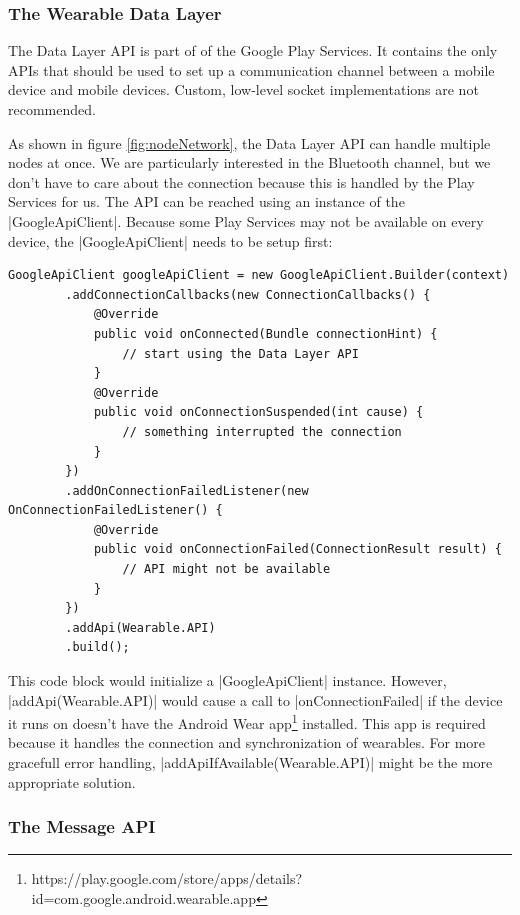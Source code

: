 \clearpage

\subsubsection{The Wearable Data Layer}

The Data Layer API is part of of the Google Play Services.
It contains the only APIs that should be used to set up a communication channel between a mobile device and mobile devices. 
Custom, low-level socket implementations are not recommended.

As shown in figure \ref{fig:nodeNetwork}, the Data Layer API can handle multiple nodes at once.
We are particularly interested in the Bluetooth channel, but we don't have to care about the connection because this is handled by the Play Services for us.
The API can be reached using an instance of the |GoogleApiClient|\cite{androiddocs:googleapiclient}.
Because some Play Services may not be available on every device, the |GoogleApiClient| needs to be setup first:

\begin{lstlisting}[label=googleapiclient]
GoogleApiClient googleApiClient = new GoogleApiClient.Builder(context)
		.addConnectionCallbacks(new ConnectionCallbacks() {
			@Override
			public void onConnected(Bundle connectionHint) {
				// start using the Data Layer API
			}
			@Override
			public void onConnectionSuspended(int cause) {
				// something interrupted the connection
			}
		})
		.addOnConnectionFailedListener(new OnConnectionFailedListener() {
			@Override
			public void onConnectionFailed(ConnectionResult result) {
				// API might not be available
			}
		})
		.addApi(Wearable.API)
		.build();
\end{lstlisting}

This code block would initialize a |GoogleApiClient| instance.
However, |addApi(Wearable.API)| would cause a call to |onConnectionFailed| if the device it runs on doesn't have the Android Wear app\footnote{https://play.google.com/store/apps/details?id=com.google.android.wearable.app} installed.
This app is required because it handles the connection and synchronization of wearables.
For more gracefull error handling, |addApiIfAvailable(Wearable.API)| might be the more appropriate solution.

\subsubsection{The Message API}

